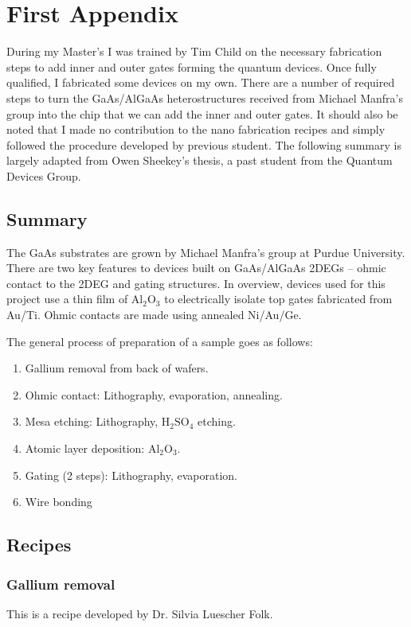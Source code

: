 \chapter{First Appendix}\label{cha:appendix1}


During my Master's I was trained by Tim Child on the necessary fabrication steps to add inner and outer gates forming the quantum devices. Once fully qualified, I fabricated some devices on my own. There are a number of required steps to turn the GaAs/AlGaAs heterostructures received from Michael Manfra's group into the chip that we can add the inner and outer gates. It should also be noted that I made no contribution to the nano fabrication recipes and simply followed the procedure developed by previous student. The following summary is largely adapted from Owen Sheekey's thesis, a past student from the Quantum Devices Group. 

\section{Summary}
The GaAs substrates are grown by Michael Manfra’s group at Purdue University. There are two key features to devices built on GaAs/AlGaAs 2DEGs – ohmic contact to the 2DEG and gating structures. In overview, devices used for this project use a thin film of $\mathrm{Al_2O_3}$ to electrically isolate top gates fabricated from Au/Ti. Ohmic contacts are made using annealed Ni/Au/Ge.

The general process of preparation of a sample goes as follows:

\begin{enumerate}
\item Gallium removal from back of wafers.
\item Ohmic contact: Lithography, evaporation, annealing.
\item Mesa etching: Lithography, $\mathrm{H_2SO_4}$ etching.
\item Atomic layer deposition: $\mathrm{Al_2O_3}$.
\item Gating (2 steps): Lithography, evaporation.
\item Wire bonding
\end{enumerate}

\section{Recipes}

\subsection{Gallium removal}
This is a recipe developed by Dr. Silvia Luescher Folk.


